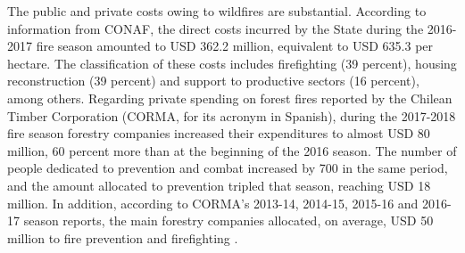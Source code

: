 \documentclass[11pt]{article}
\begin{document}
\begin{spacing}{1.3}



The public and private costs owing to wildfires are substantial.  According to information from CONAF, the direct costs incurred by the State during the 2016-2017 fire season amounted to USD 362.2 million, equivalent to USD 635.3 per hectare. The classification of these costs includes firefighting (39 percent), housing reconstruction (39 percent) and support to productive sectors (16 percent), among others. Regarding private spending on forest fires reported by the Chilean Timber Corporation (CORMA, for its acronym in Spanish), during the 2017-2018 fire season forestry companies increased their expenditures to almost USD 80 million, 60 percent more than at the beginning of the 2016 season. The number of people dedicated to prevention and combat increased by 700 in the same period, and the amount allocated to prevention tripled that season, reaching USD 18 million. In addition, according to CORMA's 2013-14, 2014-15, 2015-16 and 2016-17 season reports, the main forestry companies allocated, on average, USD 50 million to fire prevention and firefighting \citep{CR2}.



\end{spacing}
\end{document}
